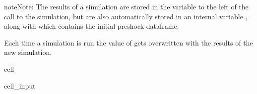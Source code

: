 \documentclass[letterpaper,10pt,english]{jupyterBook}
\begin{document}
\begin{sphinxadmonition}{note}{Note:}
\sphinxAtStartPar
The results of a simulation are stored in the variable to the left of the call to the simulation, but are also automatically stored in an internal variable , along with  which contains the initial pre\sphinxhyphen{}shock dataframe.

\sphinxAtStartPar
Each time a simulation is run the value of  gets overwritten with the results of the new simulation.
\end{sphinxadmonition}

\begin{sphinxuseclass}{cell}\begin{sphinxVerbatimInput}

\begin{sphinxuseclass}{cell_input}
\begin{sphinxVerbatim}[commandchars=\\\{\}]
  

  
    \PYG{p}{[}\PYG{p}{]}\PYG{p}{[}\PYG{p}{]}  
\end{sphinxVerbatim}

\end{sphinxuseclass}\end{sphinxVerbatimInput}
\begin{sphinxVerbatimOutput}


\end{sphinxVerbatimOutput}
\end{sphinxuseclass}
\end{document}
